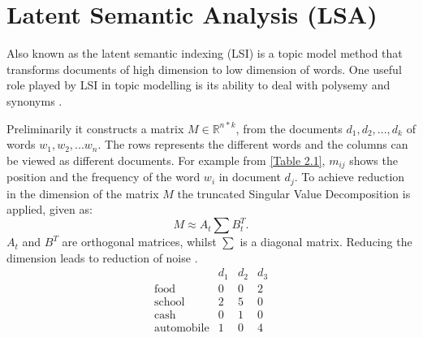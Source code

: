 \section{Latent Semantic Analysis (LSA)}
\begin{flushleft}
Also known as the latent semantic indexing (LSI) is a topic model method
that transforms documents of high dimension to low dimension of words. One useful role played by LSI in topic modelling is its ability to deal with polysemy and synonyms \cite{deerwester1990indexing}.
\end{flushleft} 
Preliminarily it constructs a matrix $M\in \mathbb{R}^{n*k}$, from the documents $d_1, d_2,..., d_k$ of words $w_1, w_2, ... w_n$. The rows represents the different words and the columns can be viewed as different documents.
For example from \eqref{Table 2.1}, $m_{ij}$ shows the position and the frequency of the word $w_i$ in document $d_j$.
To achieve reduction in the dimension of the matrix $M$ the truncated Singular Value Decomposition is applied, given as:
$$M\approx A_t \sum B^{T}_t.$$
$A_t$ and $B^T$ are orthogonal matrices, whilst $ \sum$ is a diagonal matrix.
Reducing the dimension leads to reduction of noise \cite{deerwester1990indexing}.
$$\begin{array}{cccc}
 &d_1 & d_2 &d_3 \\ 
 \text{food} & 0 & 0 & 2 \\ 
 \text{school} & 2 & 5 & 0 \\ 
 \text{cash} & 0 & 1 & 0 \\ 
 \text{automobile} & 1 & 0 & 4
  \end{array} $$

